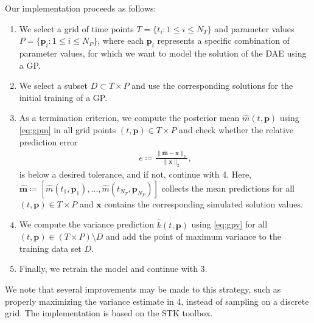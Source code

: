\documentclass[AMA,STIX1COL]{WileyNJD-v2}
\newcommand{\mb}[1]{\mathbf{#1}}
\newcommand{\mbh}[1]{\hat{\mathbf{#1}}}
\begin{document}
Our implementation proceeds as follows:
\begin{enumerate}
    \item We select a grid of time points $T = \{ t_i: 1 \leq i \leq N_T \}$ and parameter values $P = \{ \mb{p}_i: 1 \leq i \leq N_P \}$, where each $\mb{p}_i$ represents a specific combination of parameter values, for which we want to model the solution of the DAE using a GP.
    \item We select a subset $D \subset T \times P$ and use the corresponding solutions for the initial training of a GP.
    \item As a termination criterion, we compute the posterior mean $\hat{m}(t, \mb{p})$ using \eqref{eq:gpm} in all grid points $(t, \mb{p}) \in T \times P$ and check whether the relative prediction error
    \begin{align*}
        e \coloneqq \frac{\| \mbh{m} - \mb{x} \|_2}{ \| \mb{x} \|_2},
    \end{align*}
    is below a desired tolerance, and if not, continue with 4. Here, $\mbh{m} \coloneqq [\hat{m}(t_1, \mb{p}_1), \dotsc, \hat{m}(t_{N_T}, \mb{p}_{N_P})]$ collects the mean predictions for all $(t, \mb{p}) \in T \times P$ and $\mb{x}$ contains the corresponding simulated solution values.
    \item We compute the variance prediction $\hat{k}(t, \mb{p})$ using \eqref{eq:gpv} for all $(t, \mb{p}) \in (T \times P) \setminus D$ and add the point of maximum variance to the training data set $D$.
    \item Finally, we retrain the model and continue with 3.
\end{enumerate}

We note that several improvements may be made to this strategy, such as properly maximizing the variance estimate in 4, instead of sampling on a discrete grid. The implementation is based on the STK toolbox\cite{stk}.
\end{document}

